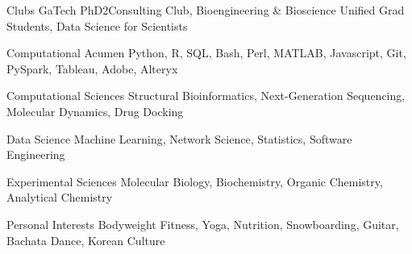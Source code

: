 \vspace{2mm}

\begin{cvskills}

  \cvskill
    {Clubs} %
    {GaTech PhD2Consulting Club, Bioengineering \& Bioscience Unified Grad Students, Data Science for Scientists} %
    
  \cvskill
    {Computational Acumen} %
    {Python, R, SQL, Bash, Perl, MATLAB, Javascript, Git, PySpark, Tableau, Adobe, Alteryx} %
    
  \cvskill
    {Computational Sciences} %
    {Structural Bioinformatics, Next-Generation Sequencing, Molecular Dynamics, Drug Docking} %
     
  \cvskill
    {Data Science} %
    {Machine Learning, Network Science, Statistics, Software Engineering} %
    
  \cvskill
    {Experimental Sciences} %
    {Molecular Biology, Biochemistry, Organic Chemistry, Analytical Chemistry} %

  \cvskill
    {Personal Interests} %
    {Bodyweight Fitness, Yoga, Nutrition, Snowboarding, Guitar, Bachata Dance, Korean Culture} %
    
\vspace{-8.0mm}
\end{cvskills}
